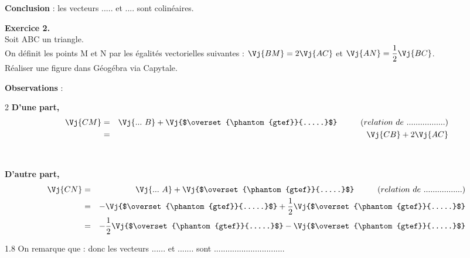 \documentclass[a4paper,10pt,french]{article}
\begin{document}
\textbf{Conclusion} : les vecteurs ..... et .... sont colinéaires. 

\smallskip


\bigskip

\bigskip

\textbf{{\large Exercice 2.}}\\
\I Soit ABC un triangle.\\
On définit les points M et N par les égalités vectorielles suivantes : $\Vj{BM}=2\Vj{AC}$ et $\Vj{AN}=\dfrac{1}{2} \Vj{BC}$.\\
Réaliser une figure dans Géogébra via Capytale.

\medskip

\textbf{Observations} : \dotfill

\begin{multicols}{2}
\textbf{D'une part, }
\begin{eqnarray*}
\Vj{CM} & = & \Vj{...\ B} + \Vj{$\overset{\phantom{gtef}}{.....}$} \hspace*{1cm} (relation \ de \ ................. )\\
 &=& \Vj {CB} + 2\Vj {AC}
\end{eqnarray*}
\ \\
\ \\
\textbf{D'autre part, }
\begin{eqnarray*}
\Vj{CN} &=&  \Vj{...\ A} + \Vj{$\overset{\phantom{gtef}}{.....}$} \hspace*{1cm} (relation \ de \ ................. )\\
&=& -\Vj{$\overset{\phantom{gtef}}{.....}$} + \dfrac{1}{2}\Vj{$\overset{\phantom{gtef}}{.....}$} \\
&=& -\dfrac{1}{2}\Vj{$\overset{\phantom{gtef}}{.....}$}  - \Vj{$\overset{\phantom{gtef}}{.....}$}
\end{eqnarray*}
\end{multicols}

\bigskip


\I \begin{spacing}{1.8}
\I On remarque que :  donc les vecteurs ...... et ....... sont ...............................
\medskip

\end{spacing}
\end{document}
